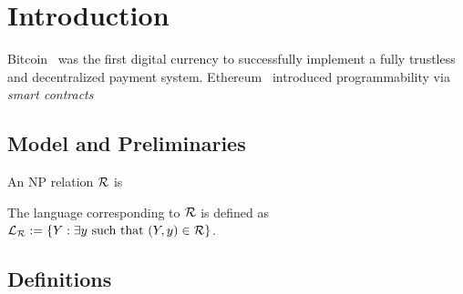 \section{Introduction}

Bitcoin~\cite{bitcoin} was the first digital currency to successfully implement a fully trustless and decentralized payment system.  Ethereum~\cite{ethereum} introduced programmability via \emph{smart contracts} 

\subsection{Model and Preliminaries}

\begin{definition}[NP Relation]
    An NP relation $\mathcal{R}$ is 

    The language corresponding to $\mathcal{R}$ is defined as $\mathcal{L}_{\mathcal{R}} := \{ Y : \exists y \text{ such that } (Y, y) \in \mathcal{R} \}$.
\end{definition}

\subsection{Definitions}

